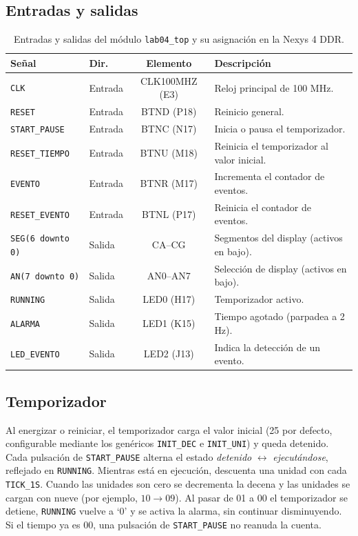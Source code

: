 \documentclass[letterpaper,12pt]{article}
\begin{document}
\subsection{Entradas y salidas}
\begin{table}[H]
\centering
\caption{Entradas y salidas del módulo \texttt{lab04\_top} y su asignación en la Nexys 4 DDR.}
\label{tab:io}
\small
\begin{tabularx}{\textwidth}{|l|l|c|X|}
\hline
\textbf{Señal} & \textbf{Dir.} & \textbf{Elemento} & \textbf{Descripción} \\ \hline
\texttt{CLK}              & Entrada & CLK100MHZ (E3) & Reloj principal de 100 MHz. \\ \hline
\texttt{RESET}            & Entrada & BTND (P18)     & Reinicio general. \\ \hline
\texttt{START\_PAUSE}     & Entrada & BTNC (N17)     & Inicia o pausa el temporizador. \\ \hline
\texttt{RESET\_TIEMPO}    & Entrada & BTNU (M18)     & Reinicia el temporizador al valor inicial. \\ \hline
\texttt{EVENTO}           & Entrada & BTNR (M17)     & Incrementa el contador de eventos. \\ \hline
\texttt{RESET\_EVENTO}    & Entrada & BTNL (P17)     & Reinicia el contador de eventos. \\ \hline
\texttt{SEG(6 downto 0)}  & Salida  & CA--CG         & Segmentos del display (activos en bajo). \\ \hline
\texttt{AN(7 downto 0)}   & Salida  & AN0--AN7       & Selección de display (activos en bajo). \\ \hline
\texttt{RUNNING}          & Salida  & LED0 (H17)     & Temporizador activo. \\ \hline
\texttt{ALARMA}           & Salida  & LED1 (K15)     & Tiempo agotado (parpadea a 2 Hz). \\ \hline
\texttt{LED\_EVENTO}      & Salida  & LED2 (J13)     & Indica la detección de un evento. \\ \hline
\end{tabularx}
\end{table}

\subsection{Temporizador}
Al energizar o reiniciar, el temporizador carga el valor inicial (25 por defecto, configurable mediante los genéricos \texttt{INIT\_DEC} e \texttt{INIT\_UNI}) y queda detenido. Cada pulsación de \texttt{START\_PAUSE} alterna el estado \emph{detenido} $\leftrightarrow$ \emph{ejecutándose}, reflejado en \texttt{RUNNING}. Mientras está en ejecución, descuenta una unidad con cada \texttt{TICK\_1S}. Cuando las unidades son cero se decrementa la decena y las unidades se cargan con nueve (por ejemplo, $10\rightarrow09$). Al pasar de 01 a 00 el temporizador se detiene, \texttt{RUNNING} vuelve a `0' y se activa la alarma, sin continuar disminuyendo. Si el tiempo ya es 00, una pulsación de \texttt{START\_PAUSE} no reanuda la cuenta.
\end{document}
